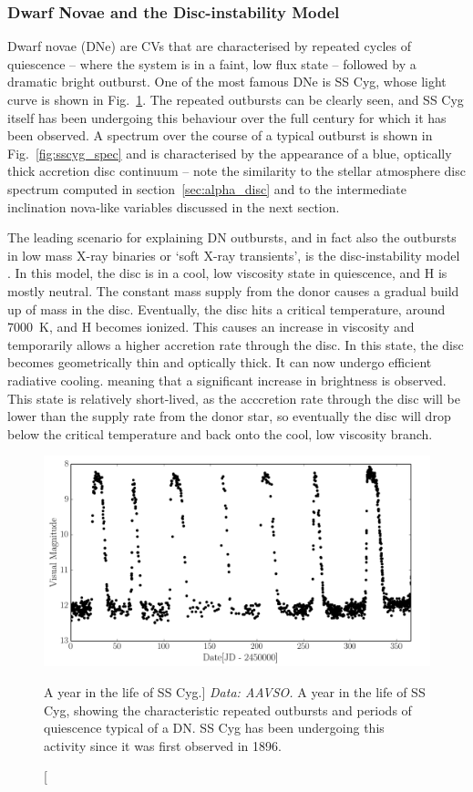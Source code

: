 \subsubsection{Dwarf Novae and the Disc-instability Model}

Dwarf novae (DNe) are CVs that are characterised 
by repeated cycles of quiescence -- 
where the system is in a faint, low flux state --   
followed by a dramatic bright outburst. One of the 
most famous DNe is SS Cyg, whose light curve is shown in 
Fig.~\ref{fig:sscyg}. The repeated outbursts can be clearly seen, and
SS Cyg itself has been undergoing this behaviour over the full century 
for which it has been observed. A spectrum over the course of a 
typical outburst is shown in Fig.~\ref{fig:sscyg_spec} 
and is characterised by the appearance of a blue, optically thick
accretion disc continuum -- note the similarity to the 
stellar atmosphere disc spectrum computed in section~\ref{sec:alpha_disc}
and to the intermediate inclination nova-like variables discussed in the next
section.

The leading scenario for explaining DN outbursts, and in fact also the outbursts
in low mass X-ray binaries or `soft X-ray transients',
is the disc-instability model \citep[DIM; ][]{osaki1974,hoshi1979,meyer1981,lasota2001}. 
In this model, the disc is in a cool, low viscosity state in quiescence, 
and H is mostly neutral. The constant mass supply from the donor causes 
a gradual build up of mass in the disc. Eventually, the disc hits a critical 
temperature, around $7000$~K, and H becomes ionized. This causes an increase
in viscosity and temporarily allows a higher accretion rate through the disc.
In this state, the disc becomes geometrically thin and
optically thick. It can now undergo efficient radiative cooling.
meaning that a significant increase in brightness is observed.
This state is relatively short-lived, as the acccretion rate through
the disc will be lower than the supply rate from the donor star, so eventually
the disc will drop below the critical temperature and back onto the cool,
low viscosity branch. 

\begin{figure}
\centering
\includegraphics[width=1.0\textwidth]{figures/01-intro/lc_sscyg.png}
\caption
[A year in the life of SS Cyg.]
{
{\sl Data: AAVSO.} 
A year in the life of SS Cyg, showing the characteristic repeated
outbursts and periods of quiescence typical of a DN. SS Cyg has been
undergoing this activity since it was first observed in 1896.
} 
\label{fig:sscyg}
\end{figure}

